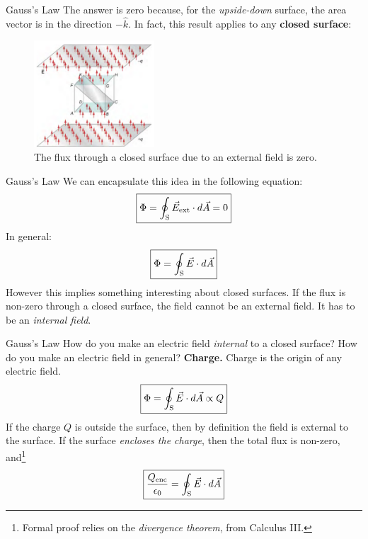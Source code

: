 \documentclass{beamer}
\begin{document}
\begin{frame}{Gauss's Law}
The answer is zero because, for the \textit{upside-down} surface, the area vector is in the direction $-\hat{k}$.  In fact, this result applies to any \textbf{closed surface}:
\begin{figure}
\centering
\includegraphics[width=0.4\textwidth]{figures/cube.png}
\caption{\label{fig:cube} The flux through a closed surface due to an external field is zero.}
\end{figure}
\end{frame}

\begin{frame}{Gauss's Law}
We can encapsulate this idea in the following equation:
\begin{equation}
\boxed{
\Phi = \oint_{\rm S} \vec{E}_{\rm ext} \cdot d\vec{A} = 0} \label{eq:ext}
\end{equation}
In general:
\begin{equation}
\boxed{
\Phi = \oint_{\rm S} \vec{E} \cdot d\vec{A}} \label{eq:general}
\end{equation}
However this implies something interesting about closed surfaces.  If the flux is non-zero through a closed surface, the field cannot be an external field.  It has to be an \textit{internal field}.
\end{frame}

\begin{frame}{Gauss's Law}
How do you make an electric field \textit{internal} to a closed surface?  How do you make an electric field in general?  \textbf{Charge.}  Charge is the origin of any electric field.
\begin{equation}
\boxed{
\Phi = \oint_{\rm S} \vec{E} \cdot d\vec{A} \propto Q} \label{eq:general2}
\end{equation}
If the charge $Q$ is outside the surface, then by definition the field is external to the surface.  If the surface \textit{encloses the charge}, then the total flux is non-zero, and\footnote{Formal proof relies on the \textit{divergence theorem}, from Calculus III.}
\begin{equation}
\boxed{
\frac{Q_{\rm enc}}{\epsilon_0} = \oint_{\rm S} \vec{E} \cdot d\vec{A}} \label{eq:gauss}
\end{equation}
\end{frame}
\end{document}
